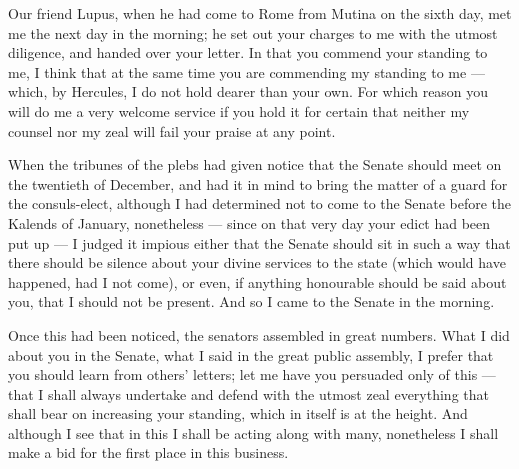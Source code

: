 

 Our friend Lupus, when he had come to Rome from Mutina on the sixth day, met me the next day in the morning; he set out your charges to me with the utmost diligence, and handed over your letter. In that you commend your standing to me, I think that at the same time you are commending my standing to me --- which, by Hercules, I do not hold dearer than your own. For which reason you will do me a very welcome service if you hold it for certain that neither my counsel nor my zeal will fail your praise at any point.

 When the tribunes of the plebs had given notice that the Senate should meet on the twentieth of December, and had it in mind to bring the matter of a guard for the consuls-elect, although I had determined not to come to the Senate before the Kalends of January, nonetheless --- since on that very day your edict had been put up --- I judged it impious either that the Senate should sit in such a way that there should be silence about your divine services to the state (which would have happened, had I not come), or even, if anything honourable should be said about you, that I should not be present. And so I came to the Senate in the morning.

 Once this had been noticed, the senators assembled in great numbers. What I did about you in the Senate, what I said in the great public assembly, I prefer that you should learn from others' letters; let me have you persuaded only of this --- that I shall always undertake and defend with the utmost zeal everything that shall bear on increasing your standing, which in itself is at the height. And although I see that in this I shall be acting along with many, nonetheless I shall make a bid for the first place in this business.
